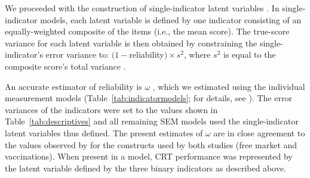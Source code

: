 \documentclass[fignum,man]{apa}\usepackage[]{graphicx}\usepackage[]{color}
\begin{document}
We proceeded with the construction of
single-indicator latent variables \cite{Hayduk96,Joreskog82}.
In single-indicator models, each latent variable is defined 
by one indicator consisting of an equally-weighted composite 
of the items (i.e., the mean score).
The true-score variance for each latent variable is then obtained by 
constraining the single-indicator's error variance 
to: $(1 - $reliability$) \times s^2$, 
where $s^2$ is equal to the composite score's total variance \cite{Joreskog82}.

An accurate 
estimator of reliability 
is $\omega$ \cite{Komaroff97,Raykov97}, which
  we estimated using the individual measurement 
models (Table~\ref{tab:indicatormodels}; 
for details, see ).
The error variances of the indicators were set to 
the values shown in Table~\ref{tab:descriptives}
and all remaining SEM models used the single-indicator latent variables 
thus defined. 
The present estimates of $\omega$ are in close agreement to the values observed by 
 for the constructs used by both studies (free market and vaccinations). 
When present in a model, CRT performance was represented by the latent variable defined by the
three binary indicators as described above.
\end{document}
